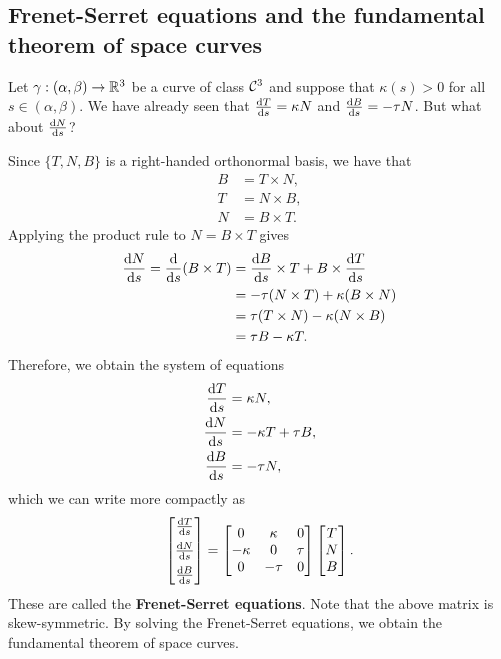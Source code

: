 \subsection{Frenet-Serret equations and the fundamental theorem of 
space curves} \label{subsec:2.3}
Let $\gamma : (\alpha, \beta) \to \mathbb{R}^3$ be a curve of class ${\cal C}^3$ and suppose 
that $\kappa(s) > 0$ for all $s \in (\alpha, \beta)$. We have already seen that 
$\frac{{\rm d}T}{{\rm d}s} = \kappa N$ and $\frac{{\rm d}B}{{\rm d}s} = -\tau N$.
But what about $\frac{{\rm d}N}{{\rm d}s}$? 

Since $\{T, N, B\}$ is a right-handed orthonormal basis, we have that 
\begin{align*}
    B &= T \times N, \\ 
    T &= N \times B, \\ 
    N &= B \times T. 
\end{align*}
Applying the product rule to $N = B \times T$ gives 
\begin{align*} 
    \frac{{\rm d}N}{{\rm d}s} = \frac{{\rm d}}{{\rm d}s}(B \times T) 
    &= \frac{{\rm d}B}{{\rm d}s} \times T + B \times \frac{{\rm d}T}{{\rm d}s} \\ 
    &= -\tau(N \times T) + \kappa(B \times N) \\
    &= \tau(T \times N) - \kappa(N \times B) \\
    &= \tau B - \kappa T.
\end{align*}
Therefore, we obtain the system of equations 
\begin{align*}
    \frac{{\rm d}T}{{\rm d}s} &= \kappa N, \\ 
    \frac{{\rm d}N}{{\rm d}s} &=  - \kappa T + \tau B, \\ 
    \frac{{\rm d}B}{{\rm d}s} &= -\tau N,
\end{align*}
which we can write more compactly as 
\[ \begin{bmatrix}
    \frac{{\rm d}T}{{\rm d}s} \\[5pt] 
    \frac{{\rm d}N}{{\rm d}s} \\[5pt] 
    \frac{{\rm d}B}{{\rm d}s}
\end{bmatrix} = \begin{bmatrix}
    0 & \kappa & 0 \\ 
    -\kappa & 0 & \tau \\ 
    0 & -\tau & 0 
\end{bmatrix} \begin{bmatrix}
    T \\ N \\ B 
\end{bmatrix}. \] 
These are called the {\bf Frenet-Serret equations}. Note that the above matrix 
is skew-symmetric. 
By solving the Frenet-Serret equations, we obtain the fundamental theorem 
of space curves.

